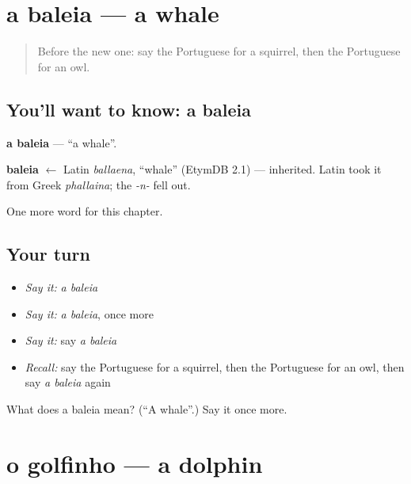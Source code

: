 \section[a baleia]{a baleia — a whale}

\label{lesson:PT-C119-baleia}



\begin{quote}
Before the new one: say the Portuguese for a squirrel, then the Portuguese for an owl.
\end{quote}

\subsection*{You'll want to know: a baleia}
\textbf{a baleia} — \textquotedblleft{}a whale\textquotedblright{}.

\begin{cousinweb}
\textbf{baleia} $\leftarrow$ Latin \emph{ballaena}, \textquotedblleft{}whale\textquotedblright{} (EtymDB 2.1) — inherited. Latin took it from Greek \emph{phallaina}; the \emph{-n-} fell out.
\end{cousinweb}

\begin{grammarlens}[title={What you've built}]
One more word for this chapter.
\end{grammarlens}

\subsection*{Your turn}
\begin{itemize}
\raggedright
  \item \emph{Say it:} \emph{a baleia}
  \item \emph{Say it:} \emph{a baleia}, once more
  \item \emph{Say it:} say \emph{a baleia}
  \item \emph{Recall:} say the Portuguese for a squirrel, then the Portuguese for an owl, then say \emph{a baleia} again
\end{itemize}

\begin{tcolorbox}[breakable,colback=teal!4,colframe=teal!35!black,title={Before you move on}]
What does a baleia mean? (\textquotedblleft{}A whale\textquotedblright{}.) Say it once more.
\end{tcolorbox}
\section[o golfinho]{o golfinho — a dolphin}

